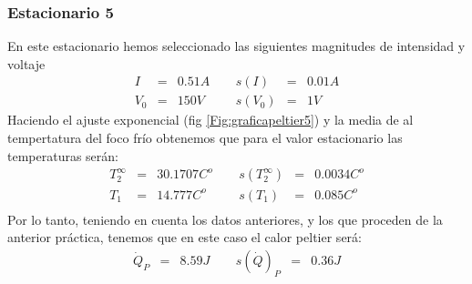 \documentclass[12pt,a4paper]{article}
\begin{document}
\subsubsection{Estacionario 5}
En este estacionario hemos seleccionado las siguientes magnitudes de intensidad y voltaje  
\begin{equation} 
\begin{array}{lllllll}
I & = & 0.51 A & \ \ & s(I) & = & 0.01  A \\ 
 V_0 & = & 150 V & \ \ & s(V_0) & = & 1 V
\end{array} 
\end{equation} 
 Haciendo el ajuste exponencial (fig \ref{Fig:graficapeltier5}) y la media de al tempertatura del foco frío obtenemos que para el valor estacionario las temperaturas serán: 
\begin{equation} 
\begin{array}{lllllll}
T_2^{\infty} & = & 30.1707 C^o &  \ \ &  s(T_2^{\infty}) & =  & 0.0034  C^o \\ 
 T_1 & = & 14.777  C^o & \ \ & s(T_1) & = & 0.085  C^o \\ 
 \end{array} 
\end{equation} 
 Por lo tanto, teniendo en cuenta los datos anteriores, y los que proceden de la anterior práctica, tenemos que en este caso el calor peltier será: 
\begin{equation} 
\begin{array}{lllllll}
\dot{Q}_P & = & 8.59 J & \ \ & s(\dot{Q})_P & = & 0.36 J \\ 
\end{array} 
\end{equation} 
 
 
 
 
\end{document}
